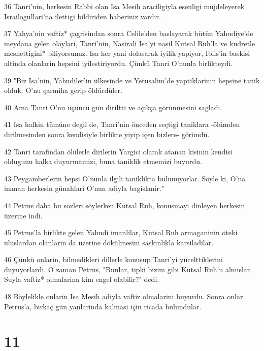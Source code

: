\par 36 Tanri'nin, herkesin Rabbi olan Isa Mesih araciligiyla esenligi müjdeleyerek Israilogullari'na ilettigi bildiriden haberiniz vardir.
\par 37 Yahya'nin vaftiz* çagrisindan sonra Celile'den baslayarak bütün Yahudiye'de meydana gelen olaylari, Tanri'nin, Nasirali Isa'yi nasil Kutsal Ruh'la ve kudretle meshettigini* biliyorsunuz. Isa her yani dolasarak iyilik yapiyor, Iblis'in baskisi altinda olanlarin hepsini iyilestiriyordu. Çünkü Tanri O'nunla birlikteydi.
\par 39 "Biz Isa'nin, Yahudiler'in ülkesinde ve Yerusalim'de yaptiklarinin hepsine tanik olduk. O'nu çarmiha gerip öldürdüler.
\par 40 Ama Tanri O'nu üçüncü gün diriltti ve açikça görünmesini sagladi.
\par 41 Isa halkin tümüne degil de, Tanri'nin önceden seçtigi taniklara -ölümden dirilmesinden sonra kendisiyle birlikte yiyip içen bizlere- göründü.
\par 42 Tanri tarafindan ölülerle dirilerin Yargici olarak atanan kisinin kendisi oldugunu halka duyurmamizi, buna taniklik etmemizi buyurdu.
\par 43 Peygamberlerin hepsi O'nunla ilgili taniklikta bulunuyorlar. Söyle ki, O'na inanan herkesin günahlari O'nun adiyla bagislanir."
\par 44 Petrus daha bu sözleri söylerken Kutsal Ruh, konusmayi dinleyen herkesin üzerine indi.
\par 45 Petrus'la birlikte gelen Yahudi imanlilar, Kutsal Ruh armaganinin öteki uluslardan olanlarin da üzerine dökülmesini saskinlikla karsiladilar.
\par 46 Çünkü onlarin, bilmedikleri dillerle konusup Tanri'yi yücelttiklerini duyuyorlardi. O zaman Petrus, "Bunlar, tipki bizim gibi Kutsal Ruh'u almislar. Suyla vaftiz* olmalarina kim engel olabilir?" dedi.
\par 48 Böylelikle onlarin Isa Mesih adiyla vaftiz olmalarini buyurdu. Sonra onlar Petrus'a, birkaç gün yanlarinda kalmasi için ricada bulundular.

\chapter{11}

